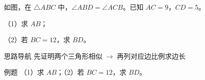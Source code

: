 \documentclass{exam-zh}
\begin{document}

\begin{eduProblemBlock}[例题 1]
\noindent
\begin{minipage}[t]{\dimexpr\linewidth-70mm-6mm\relax}
\vspace{0pt}
如图，在 $\triangle ABC$ 中，$\angle ABD=\angle ACB$。已知 $AC=9$，$CD=5$。

（1）求 $AB$；

（2）若 $BC=12$，求 $BD$。

\end{minipage}\hfill
\begin{diagramcoltikz}{70mm}{先找出两个相似三角形，再判断 $CD$ 属不属于它们的边。}
}
\end{diagramcoltikz}
\end{eduProblemBlock}





\begin{eduAuxItem}{思路导航}
先证明两个三角形相似$\;\to\;$再列对应边比例求边长\end{eduAuxItem}




\begin{eduSubQuestionItem}{例题}
（1）求 $AB$；（2）若 $BC=12$，求 $BD$。\end{eduSubQuestionItem}

\begin{eduDualExplain}
  \begin{eduExplainLeft}
  \end{eduExplainLeft}

  \begin{eduExplainRight}
  \end{eduExplainRight}
\end{eduDualExplain}
\end{document}
